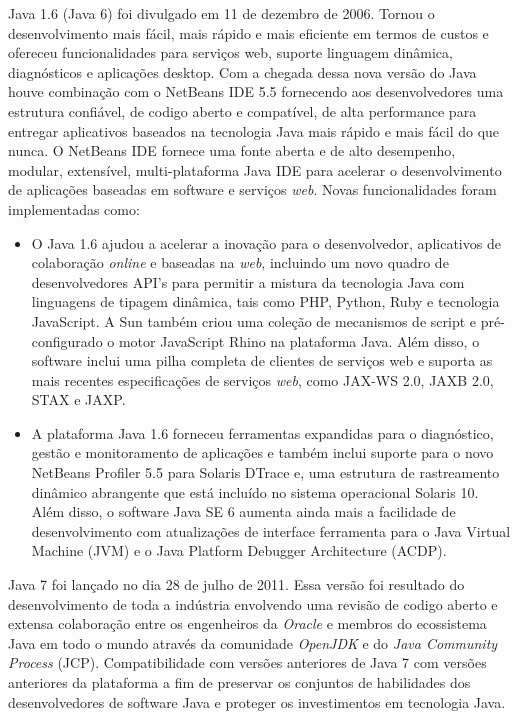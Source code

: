 Java 1.6 (Java 6) foi divulgado em 11 de dezembro de 2006. Tornou o desenvolvimento mais fácil, mais rápido e mais eficiente em termos de custos e ofereceu funcionalidades para serviços web, suporte linguagem dinâmica, diagnósticos e aplicações desktop. Com a chegada dessa nova versão do Java houve combinação com o NetBeans IDE 5.5 fornecendo aos desenvolvedores uma estrutura confiável, de codigo aberto e compatível, de alta performance para entregar aplicativos baseados na tecnologia Java mais rápido e mais fácil do que nunca. O NetBeans IDE fornece uma fonte aberta e de alto desempenho, modular, extensível, multi-plataforma Java IDE para acelerar o desenvolvimento de aplicações baseadas em software e serviços {\it web}.
Novas funcionalidades foram implementadas como:

\begin{itemize}
  \item O Java 1.6 ajudou a acelerar a inovação para o desenvolvedor, aplicativos de colaboração {\it online} e baseadas na {\it web}, incluindo um novo quadro de desenvolvedores \acs{API}'s para permitir a mistura da tecnologia Java com linguagens de tipagem dinâmica, tais como PHP, Python, Ruby e tecnologia JavaScript. A Sun também criou uma coleção de mecanismos de script e pré-configurado o motor JavaScript Rhino na plataforma Java. Além disso, o software inclui uma pilha completa de clientes de serviços web e suporta as mais recentes especificações de serviços {\it web}, como \acs{JAX-WS} 2.0, \acs{JAXB} 2.0, \acs{STAX} e \acs{JAXP}.
  \item A plataforma Java 1.6 forneceu ferramentas expandidas para o diagnóstico, gestão e monitoramento de aplicações e também inclui suporte para o novo NetBeans Profiler 5.5 para Solaris DTrace e, uma estrutura de rastreamento dinâmico abrangente que está incluído no sistema operacional Solaris 10. Além disso, o software Java SE 6 aumenta ainda mais a facilidade de desenvolvimento com atualizações de interface ferramenta para o Java Virtual Machine (\acs{JVM}) e o Java Platform Debugger Architecture (\acs{ACDP}).
\end{itemize}

Java 7 \cite{JSE7} foi lançado no dia 28 de julho de 2011. Essa versão foi resultado do desenvolvimento de toda a indústria envolvendo uma revisão de codigo aberto e extensa colaboração entre os engenheiros da {\it Oracle} e membros do ecossistema Java em todo o mundo através da comunidade {\it OpenJDK} e do {\it Java Community Process} (\acs{JCP}). Compatibilidade com versões anteriores de Java 7 com versões anteriores da plataforma a fim de preservar os conjuntos de habilidades dos desenvolvedores de software Java e proteger os investimentos em tecnologia Java.

